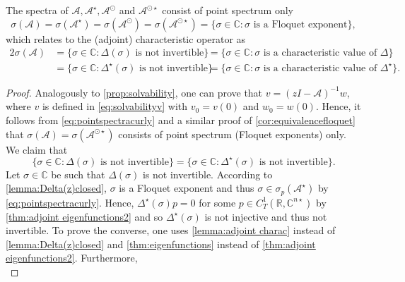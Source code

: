 \documentclass[english]{myarticle}
\begin{document}
\begin{sloppypar}
\begin{corollary} \label{cor:spectra}
The spectra of $\mathcal{A}, \mathcal{A}^\star, \mathcal{A}^\odot$ and $\mathcal{A}^{\odot \star}$ consist of point spectrum only
\begin{equation*} \label{eq:pointspectra}
    \sigma(\mathcal{A}) = \sigma(\mathcal{A}^\star) = \sigma(\mathcal{A}^\odot) = \sigma(\mathcal{A}^{\odot \star}) = \{ \sigma \in \mathbb{C} : \sigma \mbox{ is a Floquet exponent} \},
\end{equation*}
which relates to the (adjoint) characteristic operator as
\begin{alignat*}{2}
    \sigma(\mathcal{A}) &= \{ \sigma \in \mathbb{C} : \Delta(\sigma) \mbox{ is not invertible} \}  &&= \{ \sigma \in \mathbb{C} : \sigma \mbox{ is a characteristic value of } \Delta \} \\
    &= \{ \sigma \in \mathbb{C} : \Delta^\star(\sigma) \mbox{ is not invertible} \}  &&= \{ \sigma \in \mathbb{C} : \sigma \mbox{ is a characteristic value of } \Delta^\star \}.
\end{alignat*}
\end{corollary}
\begin{proof}
Analogously to \cref{prop:solvability}, one can prove that $v = (zI-\mathcal{A})^{-1}w$, where $v$ is defined in \eqref{eq:solvabilityv} with $v_0 = v(0)$ and $w_0 = w(0)$. Hence, it follows from \eqref{eq:pointspectracurly} and a similar proof of \cref{cor:equivalencefloquet} that $\sigma(\mathcal{A}) = \sigma(\mathcal{A}^{\odot \star})$ consists of point spectrum (Floquet exponents) only. We claim that
\begin{equation} \label{eq:invertibleDeltaDeltastar}
    \{ \sigma \in \mathbb{C} : \Delta(\sigma) \mbox{ is not invertible} \} = \{ \sigma \in \mathbb{C} : \Delta^\star(\sigma) \mbox{ is not invertible} \}.
\end{equation}
Let $\sigma \in \mathbb{C}$ be such that $\Delta(\sigma)$ is not invertible. According to \cref{lemma:Delta(z)closed}, $\sigma$ is a Floquet exponent and thus $\sigma \in \sigma_p(\mathcal{A}^\star)$ by \eqref{eq:pointspectracurly}. Hence, $\Delta^\star(\sigma)p=0$ for some $p \in C_T^1(\mathbb{R},\mathbb{C}^{n \star})$ by \cref{thm:adjoint eigenfunctions2} and so $\Delta^\star(\sigma)$ is not injective and thus not invertible. To prove the converse, one uses \cref{lemma:adjoint charac} instead of \cref{lemma:Delta(z)closed} and \cref{thm:eigenfunctions} instead of \cref{thm:adjoint eigenfunctions2}. Furthermore, 
\begin{equation} \label{eq:spectraAstar}

\end{equation}
\end{proof}
\end{sloppypar}
\end{document}
